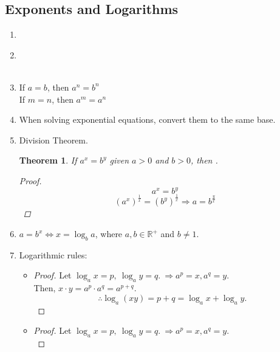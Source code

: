 \documentclass[12pt, a4paper]{article}
\newtheorem{theorem}{Theorem}[subsection]
\newtheorem{proof}{Proof}[subsection]
\begin{document}
\subsection{Exponents and Logarithms}
\begin{enumerate}
  \item {}
  \item {\color{red}{$x^0=1$}} {}\\ {}\\ {} {}
  \item If $a=b$, then $a^n=b^n$\\ If $m=n$, then $a^m=a^n$\\ {}
  \item When solving exponential equations, convert them to the same base. 
  \item Division Theorem. 
  \begin{theorem}
    If $a^x=b^y$ given $a>0$ and $b>0$, then {}.
    \begin{proof}
      $$a^x=b^y$$
      $$(a^x)^\frac{1}{x}=(b^y)^\frac{1}{x} \Rightarrow a=b^\frac{y}{x}$$
    \end{proof}
  \end{theorem}
  \item $a=b^x \Leftrightarrow x=\log_b{a}$, where $a,b \in \mathbb{R}^+$ and $b \neq 1$.
  \item Logarithmic rules: 
  \begin{itemize}
    \item {\color{red}{$\log_ax+\log_ay=\log_a(xy)$}}
    \begin{proof}
      Let $\log_ax=p,\ \log_ay=q.\ \Rightarrow a^p=x, a^q=y.$\\
      Then, $x \cdot y=a^p \cdot a^q=a^{p+q}.$
      $$\therefore \log_a(xy)=p+q=\log_ax+\log_ay.$$
    \end{proof}
    \item {}
    \begin{proof}
      Let $\log_ax=p,\ \log_ay=q.\ \Rightarrow a^p=x, a^q=y.$\\

\end{proof}
\end{itemize}
\end{enumerate}
\end{document}
